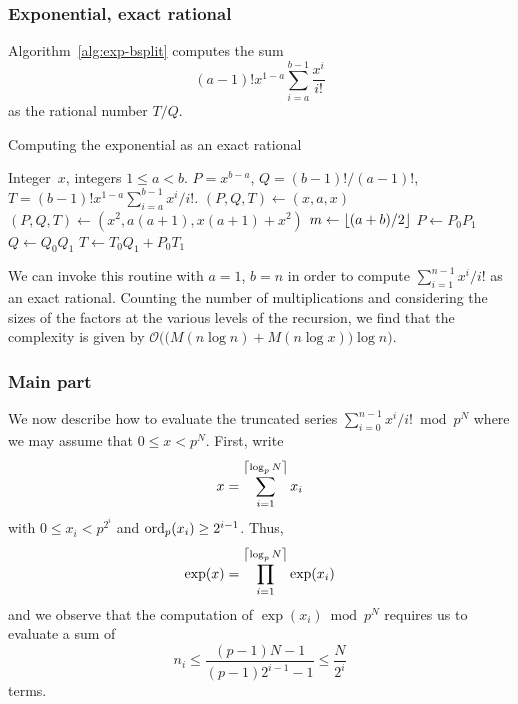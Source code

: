 \subsubsection{Exponential, exact rational}

Algorithm~\ref{alg:exp-bsplit} computes the sum 
\begin{equation}
(a-1)! x^{1-a} \sum_{i=a}^{b-1} \frac{x^i}{i!}
\end{equation}
as the rational number $T/Q$.

\begin{algorithm}
\caption{Computing the exponential as an exact rational}
\label{alg:exp-bsplit}
\begin{algorithmic}
\vspace{1mm}
\Require Integer~$x$, integers $1 \leq a < b$.
\Ensure  $P = x^{b-a}$, $Q = (b-1)! / (a-1)!$, $T = (b-1)! x^{1-a} \sum_{i=a}^{b-1} x^i / i!$.
\State $(P, Q, T) \gets (x, a, x)$
\State $(P, Q, T) \gets (x^2, a (a + 1), x (a + 1) + x^2)$
\Else
\State $m \gets \left\lfloor(a + b) / 2\right\rfloor$
\State {}
\State {}
\State $P \gets P_0 P_1$
\State $Q \gets Q_0 Q_1$
\State $T \gets T_0 Q_1 + P_0 T_1$
\EndIf
\EndProcedure
\end{algorithmic}
\end{algorithm}

We can invoke this routine with $a = 1$, $b = n$ in order to compute 
$\sum_{i=1}^{n-1} x^i / i!$ as an exact rational.  Counting the 
number of multiplications and considering the sizes of the factors 
at the various levels of the recursion, we find that the complexity 
is given by $\mathcal{O}\bigl(\bigl(M(n \log n) + M(n \log x) \bigr)\log n\bigr)$.

\subsubsection{Main part}

We now describe how to evaluate the truncated series 
$\sum_{i=0}^{n-1} x^i / i! \bmod{p^N}$ where we may assume 
that $0 \leq x < p^N$.  First, write 
\begin{equation}
x = \sum_{i=1}^{\left\lceil\log_p N\right\rceil} x_i
\end{equation}
with $0 \leq x_i < p^{2^i}$ and $\operatorname{ord}_p(x_i) \geq 2^{i-1}$.  Thus, 
\begin{equation}
\exp (x) = \prod_{i=1}^{\left\lceil\log_p N\right\rceil} \exp(x_i)
\end{equation}
and we observe that the computation of $\exp(x_i) \bmod p^N$ requires 
us to evaluate a sum of 
\begin{equation}
n_i \leq \frac{(p-1) N - 1}{(p-1) 2^{i-1} - 1} \leq \frac{N}{2^i}
\end{equation}
terms.

